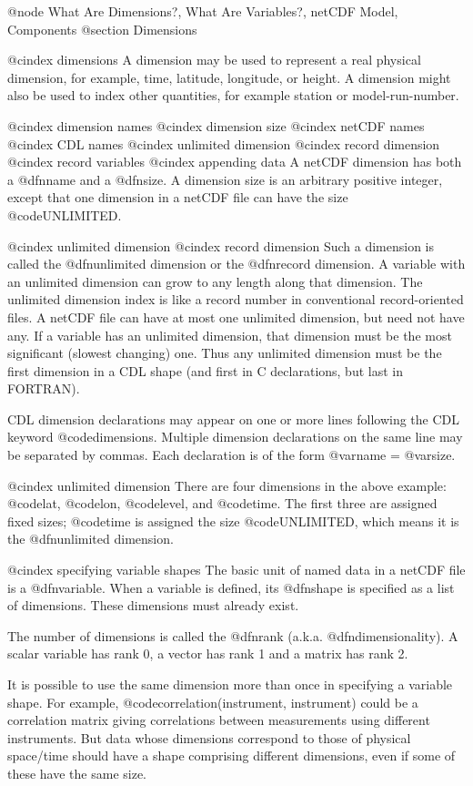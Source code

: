 @node What Are Dimensions?, What Are Variables?, netCDF Model, Components
@section Dimensions

@cindex dimensions
A dimension may be used to represent a real physical dimension, for
example, time, latitude, longitude, or height.  A dimension might also
be used to index other quantities, for example station
or model-run-number.

@cindex dimension names
@cindex dimension size
@cindex netCDF names
@cindex CDL names
@cindex unlimited dimension
@cindex record dimension
@cindex record variables
@cindex appending data
A netCDF dimension has both a @dfn{name} and a @dfn{size}.
A dimension size is an arbitrary positive integer, except that
one dimension in a netCDF file can have the size @code{UNLIMITED}.

@cindex unlimited dimension
@cindex record dimension
Such a dimension is called the @dfn{unlimited dimension} or the @dfn{record
dimension}.  A variable with an unlimited dimension can grow to any
length along that dimension.  The unlimited dimension index is like a record
number in conventional record-oriented files.
A netCDF file can have at most one unlimited dimension, but need not have any.
If a variable has an unlimited dimension, that dimension must be the
most significant (slowest changing) one.
Thus any unlimited dimension must be
the first dimension in a CDL shape (and first in C declarations, but last in
FORTRAN).

CDL dimension declarations may appear on one or more lines following the
CDL keyword @code{dimensions}.  Multiple dimension declarations on the
same line may be separated by commas.  Each declaration is of the form
@var{name} = @var{size}.

@cindex unlimited dimension
There are four dimensions in the above example: @code{lat}, @code{lon},
@code{level}, and @code{time}.  The first three are assigned
fixed sizes; @code{time} is assigned the size @code{UNLIMITED}, which means
it is the @dfn{unlimited} dimension.

@cindex specifying variable shapes
The basic unit of named data in a netCDF file is a @dfn{variable}.
When a variable is defined, its @dfn{shape} is specified as
a list of dimensions.  These dimensions must already exist.

The number of dimensions is called the @dfn{rank} (a.k.a.
@dfn{dimensionality}).
A scalar variable has rank 0, a vector has rank 1 and a matrix has rank 2.

It is possible to use the same dimension more than once in specifying a
variable shape.
For example, @code{correlation(instrument, instrument)}
could be a correlation matrix
giving correlations between measurements using different instruments.
But data whose dimensions correspond to those of physical space/time
should have a shape comprising
different dimensions, even if some of these have the same size.

